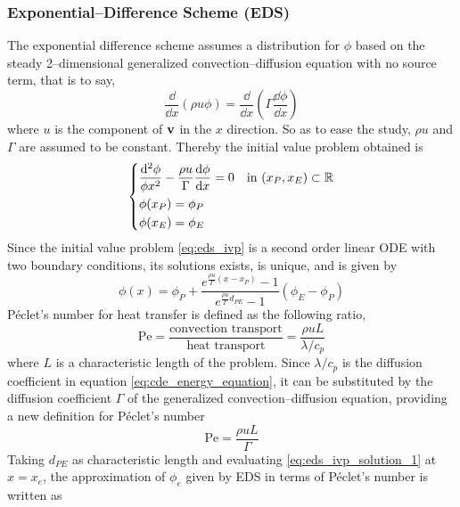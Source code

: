 \subsubsection{Exponential--Difference Scheme (EDS)}

The exponential difference scheme assumes a distribution for $\phi$ based on the steady 2--dimensional generalized convection--diffusion equation with no source term, that is to say,
\begin{equation}
	\frac{\dd}{\dd{x}} (\rho u \phi) = \frac{\dd}{\dd{x}} \left( \Gamma \frac{\dd{\phi}}{\dd{x}} \right)
\end{equation}
where $u$ is the component of $\vb{v}$ in the $x$ direction. So as to ease the study, $\rho u$ and $\Gamma$ are assumed to be constant. Thereby the initial value problem obtained is
\begin{equation} \label{eq:eds_ivp}
	\left\{
	\begin{aligned}
		&\frac{\dd^2 \phi}{\phi{x^2}} - \frac{\rho u}{\Gamma} \frac{\dd{\phi}}{\dd{x}} = 0 & &\text{in } (x_P, x_E) \subset \mathbb{R} \\
		&\phi(x_P) = \phi_P \\
		&\phi(x_E) = \phi_E \\
	\end{aligned}
	\right.
\end{equation}
Since the initial value problem \eqref{eq:eds_ivp} is a second order linear ODE with two boundary conditions, its solutions exists, is unique, and is given by
\begin{equation} \label{eq:eds_ivp_solution_1}
	\phi(x) = 
	\phi_P +
	\frac{e^{\frac{\rho u}{\Gamma} (x - x_P)} - 1}{e^{\frac{\rho u}{\Gamma} d_{PE}} - 1} (\phi_E - \phi_P)
\end{equation}
Péclet's number for heat transfer is defined as the following ratio,
\begin{equation}
	\mathrm{Pe} = 
	\frac{\text{convection transport}}{\text{heat transport}} = 
	\frac{\rho u L}{\lambda / c_p}
\end{equation}
where $L$ is a characteristic length of the problem. Since $\lambda / c_p$ is the diffusion coefficient in equation \eqref{eq:cde_energy_equation}, it can be substituted by the diffusion coefficient $\Gamma$ of the generalized convection--diffusion equation, providing a new definition for Péclet's number 
\begin{equation}
	\mathrm{Pe} = 
	\frac{\rho u L}{\Gamma}
\end{equation}
Taking $d_{PE}$ as characteristic length and evaluating \eqref{eq:eds_ivp_solution_1} at $x = x_e$, the approximation of $\phi_e$ given by EDS in terms of Péclet's number is written as
